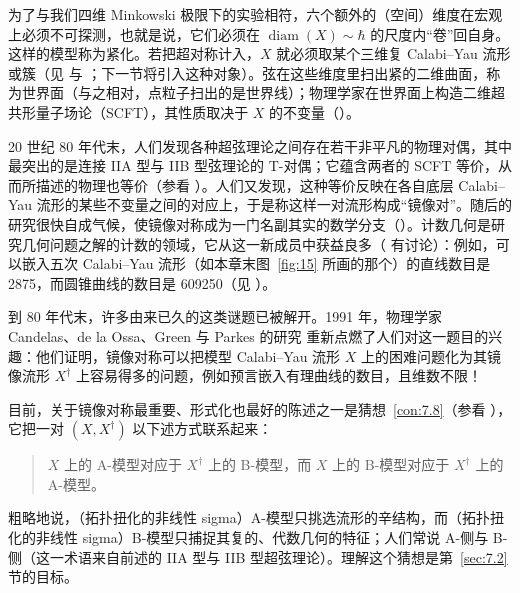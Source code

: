 为了与我们四维 Minkowski 极限下的实验相符，六个额外的（空间）维度在宏观上必须不可探测，也就是说，它们必须在 $\operatorname{diam}(X)\sim\hbar$ 的尺度内“卷”回自身。这样的模型称为紧化。若把超对称计入，$X$ 就必须取某个三维复 Calabi–Yau 流形或簇（见 \cite{GHJ03} 与 \cite{YN10}；下一节将引入这种对象）。弦在这些维度里扫出紧的二维曲面，称为世界面（与之相对，点粒子扫出的是世界线）；物理学家在世界面上构造二维超共形量子场论（SCFT），其性质取决于 $X$ 的不变量（\cite{GHJ03}）。

20 世纪 80 年代末，人们发现各种超弦理论之间存在若干非平凡的物理对偶，其中最突出的是连接 IIA 型与 IIB 型弦理论的 T-对偶；它蕴含两者的 SCFT 等价，从而所描述的物理也等价（参看 \cite{BBS07}）。人们又发现，这种等价反映在各自底层 Calabi–Yau 流形的某些不变量之间的对应上，于是称这样一对流形构成“镜像对”。随后的研究很快自成气候，使镜像对称成为一门名副其实的数学分支（\cite{ABCp09}）。计数几何是研究几何问题之解的计数的领域，它从这一新成员中获益良多（\cite{HKKp03} 有讨论）：例如，可以嵌入五次 Calabi–Yau 流形（如本章末图~\ref{fig:15} 所画的那个）的直线数目是 2875，而圆锥曲线的数目是 609250（见 \cite{YN10}）。

到 80 年代末，许多由来已久的这类谜题已被解开。1991 年，物理学家 Candelas、de la Ossa、Green 与 Parkes 的研究 \cite{CdGP91} 重新点燃了人们对这一题目的兴趣：他们证明，镜像对称可以把模型 Calabi–Yau 流形 $X$ 上的困难问题化为其镜像流形 $X^\dagger$ 上容易得多的问题，例如预言嵌入有理曲线的数目，且维数不限！

目前，关于镜像对称最重要、形式化也最好的陈述之一是猜想~\ref{con:7.8}（参看 \cite{Aur09}），它把一对 $(X,X^\dagger)$ 以下述方式联系起来：

\begin{quote}
$X$ 上的 A-模型对应于 $X^\dagger$ 上的 B-模型，而 $X$ 上的 B-模型对应于 $X^\dagger$ 上的 A-模型。
\end{quote}

粗略地说，（拓扑扭化的非线性 sigma）A-模型只挑选流形的辛结构，而（拓扑扭化的非线性 sigma）B-模型只捕捉其复的、代数几何的特征；人们常说 A-侧与 B-侧（这一术语来自前述的 IIA 型与 IIB 型超弦理论）。理解这个猜想是第~\ref{sec:7.2} 节的目标。

